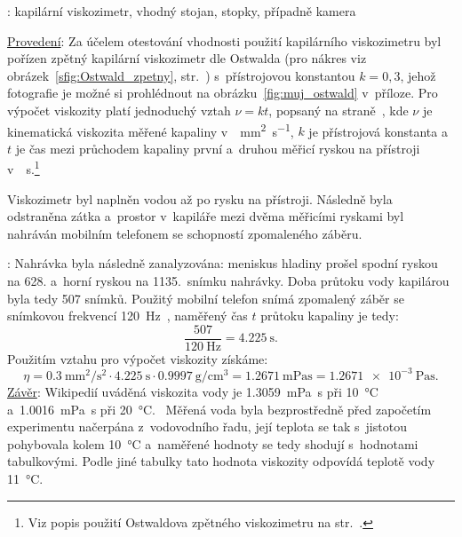 \documentclass[12pt]{article}
\begin{document}
\noindent \underline{}: kapilární viskozimetr, vhodný stojan, stopky, případně kamera
\par
\noindent \underline{Provedení}: Za účelem otestování vhodnosti použití kapilárního viskozimetru byl pořízen zpětný kapilární viskozimetr dle Ostwalda (pro nákres viz obrázek~\ref{sfig:Ostwald_zpetny}, str.~\pageref{sfig:Ostwald_zpetny}) s~přístrojovou konstantou $k = 0,3$, jehož fotografie je možné si prohlédnout na obrázku~\ref{fig:muj_ostwald} v~příloze. Pro výpočet viskozity platí jednoduchý vztah $\nu=kt$, popsaný na straně~\pageref{eq:kapilarni_viskozimetr}, kde $\nu$ je kinematická viskozita měřené kapaliny v~\SI{}{\milli\metre\squared\per\second}, $k$ je přístrojová konstanta a~$t$ je čas mezi průchodem kapaliny první a~druhou měřicí ryskou na přístroji v~\SI{}{\second}.\footnote{Viz popis použití Ostwaldova zpětného viskozimetru na str.~\pageref{sec:zpetny_ostwald}.}
\par
Viskozimetr byl naplněn vodou až po rysku na přístroji. Následně byla odstraněna zátka a~prostor v~kapiláře mezi dvěma měřicími ryskami byl nahráván mobilním telefonem se schopností zpomaleného záběru.
\par
\underline{}: Nahrávka byla následně zanalyzována: meniskus hladiny prošel spodní ryskou na 628. a~horní ryskou na 1135.~snímku nahrávky. Doba průtoku vody kapilárou byla tedy 507 snímků. Použitý mobilní telefon snímá zpomalený záběr se snímkovou frekvencí \SI{120}{\hertz}\footnotemark~\cite{rec:Samsung_A40}, naměřený čas $t$ průtoku kapaliny je tedy:
\begin{equation}
    \frac{507}{\SI{120}{\hertz}} = \SI{4,225}{\second}\text{.}
\end{equation}
Použitím vztahu pro výpočet viskozity získáme:~\cite{online:Water_density}
\begin{equation}
    \eta = \SI{0,3}{\milli\metre\squared\per\second\squared}\cdot\SI{4,225}{\second}\cdot\SI{0.9997}{\gram\per\centi\meter\cubed} = \SI{1,2671}{\milli\pascal\second} = \SI{1,2671e-3}{\pascal\second}\text{.}
\end{equation}
\noindent
\underline{Závěr}: Wikipedií uváděná viskozita vody je \SI{1,3059}{\milli\pascal\second} při \SI{10}{\degreeCelsius} a~\SI{1,0016}{\milli\pascal\second} při \SI{20}{\degreeCelsius}.~\cite{wiki:Viscosity} Měřená voda byla bezprostředně před započetím experimentu načerpána z~vodovodního řadu, její teplota se tak s~jistotou pohybovala kolem \SI{10}{\degreeCelsius} a~naměřené hodnoty se tedy shodují s~hodnotami tabulkovými. Podle jiné tabulky tato hodnota viskozity odpovídá teplotě vody \SI{11}{\degreeCelsius}.~\cite{online:Water_viscosity}
\end{document}
